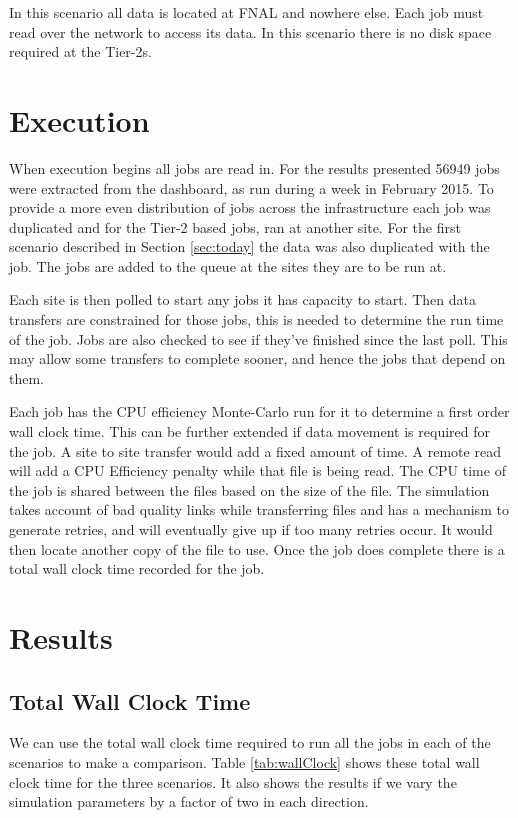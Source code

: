 \documentclass[a4paper]{jpconf}
\begin{document}
In this scenario all data is located at FNAL and nowhere else. Each
job must read over the network to access its data. In this scenario
there is no disk space required at the Tier-2s.

\section{Execution}

When execution begins all jobs are read in. For the results presented
56949 jobs were extracted from the dashboard, as run during a week in
February 2015. To provide a more even distribution of jobs across the
infrastructure each job was duplicated and for the Tier-2 based jobs,
ran at another site. For the first scenario described in Section
\ref{sec:today} the data was also duplicated with the job. The jobs
are added to the queue at the sites they are to be run at.

Each site is then polled to start any jobs it has capacity to
start. Then data transfers are constrained for those jobs, this is
needed to determine the run time of the job. Jobs are also checked to
see if they've finished since the last poll. This may allow some
transfers to complete sooner, and hence the jobs that depend on them.

Each job has the CPU efficiency Monte-Carlo run for it to determine a
first order wall clock time. This can be further extended if data
movement is required for the job. A site to site transfer would add a
fixed amount of time. A remote read will add a CPU Efficiency penalty
while that file is being read. The CPU time of the job is shared
between the files based on the size of the file. The simulation takes
account of bad quality links while transferring files and has a
mechanism to generate retries, and will eventually give up if too many
retries occur. It would then locate another copy of the file to
use. Once the job does complete there is a total wall clock time
recorded for the job.

\section{Results}

\subsection{Total Wall Clock Time}

We can use the total wall clock time required to run all the jobs in
each of the scenarios to make a comparison. Table \ref{tab:wallClock}
shows these total wall clock time for the three scenarios. It also
shows the results if we vary the simulation parameters by a factor of
two in each direction.
\end{document}

